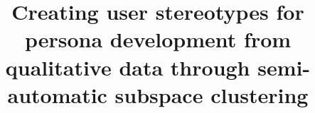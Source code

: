 %
%
%
%
%
%
\RequirePackage{fix-cm}
\RequirePackage{rotating}
%
\documentclass[smallextended, natbib]{svjour3}       %
%
\smartqed  %
%
\usepackage{graphicx}
%
%
\usepackage[linesnumbered,ruled]{algorithm2e} %
\usepackage{booktabs} %
\usepackage{placeins} %
\usepackage{tabulary}
\usepackage[T1]{fontenc}
\usepackage{url}
\usepackage{amsmath}
\usepackage{rotating}
\usepackage{hyperref}
%
\renewcommand{\algorithmcfname}{ALGORITHM}
\makeatletter
\newcommand*\bigcdot{\mathpalette\bigcdot@{.5}}
\newcommand*\bigcdot@[2]{\mathbin{\vcenter{\hbox{\scalebox{#2}{$\m@th#1\bullet$}}}}}
\makeatother

%


\title{Creating user stereotypes for persona development from qualitative data through semi-automatic subspace clustering
}

